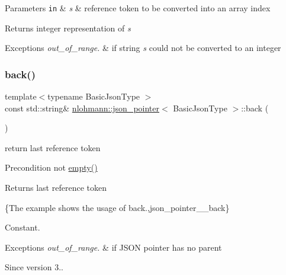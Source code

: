 \begin{DoxyParams}[1]{Parameters}
\mbox{\tt in}  & {\em s} & reference token to be converted into an array index\\
\hline
\end{DoxyParams}
\begin{DoxyReturn}{Returns}
integer representation of {\itshape s} 
\end{DoxyReturn}

\begin{DoxyExceptions}{Exceptions}
{\em out\+\_\+of\+\_\+range.} & if string {\itshape s} could not be converted to an integer \\
\hline
\end{DoxyExceptions}
\mbox{\label{classnlohmann_1_1json__pointer_a6bd5b554c10f15672135c216893eef31}} 
\subsubsection{\texorpdfstring{back()}{back()}}
{\footnotesize\ttfamily template$<$typename Basic\+Json\+Type $>$ \\
const std\+::string\& \hyperlink{classnlohmann_1_1json__pointer}{nlohmann\+::json\+\_\+pointer}$<$ Basic\+Json\+Type $>$\+::back (\begin{DoxyParamCaption}{ }\end{DoxyParamCaption})\hspace{0.3cm}{\ttfamily [inline]}}



return last reference token 

\begin{DoxyPrecond}{Precondition}
not {\ttfamily \hyperlink{classnlohmann_1_1json__pointer_a649252bda4a2e75a0915b11a25d8bcc3}{empty()}} 
\end{DoxyPrecond}
\begin{DoxyReturn}{Returns}
last reference token
\end{DoxyReturn}
\{The example shows the usage of {\ttfamily back}.,json\+\_\+pointer\+\_\+\+\_\+back\}

Constant.


\begin{DoxyExceptions}{Exceptions}
{\em out\+\_\+of\+\_\+range.} & if J\+S\+ON pointer has no parent\\
\hline
\end{DoxyExceptions}
\begin{DoxySince}{Since}
version 3.. 
\end{DoxySince}
\mbox{\label{classnlohmann_1_1json__pointer_a90d38e45e2d3add52d824bc55da8f772}} 
